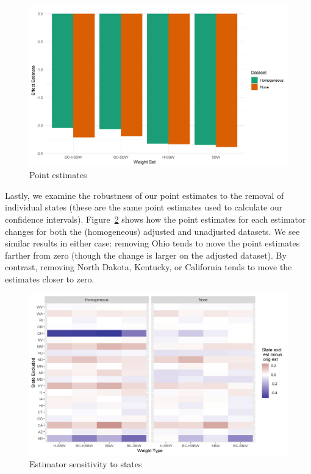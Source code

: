 \begin{figure}[H]
\begin{center}
    \caption{Point estimates}
    \label{fig:estimators}
    \includegraphics[scale=0.6]{01_Plots/point-estimates-c1.png}
\end{center}
\end{figure}

Lastly, we examine the robustness of our point estimates to the removal of individual states (these are the same point estimates used to calculate our confidence intervals). Figure~\ref{fig:loostateplot} shows how the point estimates for each estimator changes for both the (homogeneous) adjusted and unadjusted datasets. We see similar results in either case: removing Ohio tends to move the point estimates farther from zero (though the change is larger on the adjusted dataset). By contrast, removing North Dakota, Kentucky, or California tends to move the estimates closer to zero. 

\begin{figure}[H]
\begin{center}
    \caption{Estimator sensitivity to states}
    \label{fig:loostateplot}
    \includegraphics[scale=0.6]{01_Plots/loostate-sensitivityc1-state-uu-i.png}
\end{center}
\end{figure}


